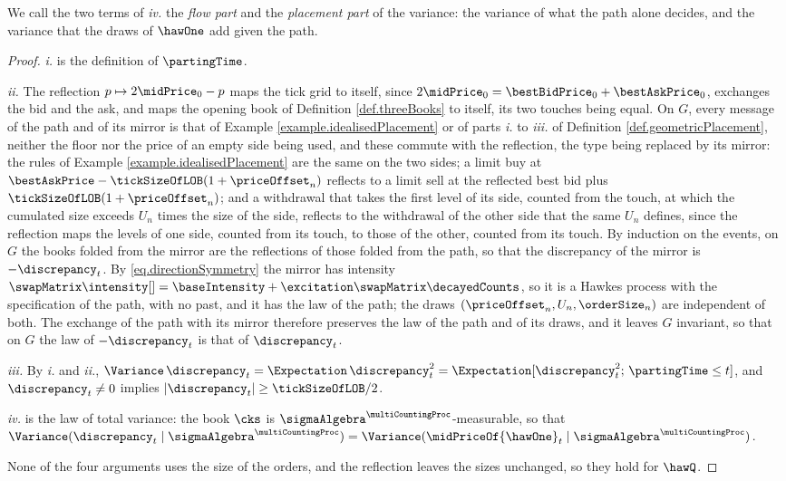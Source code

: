 We call the two terms of \emph{iv.} the \emph{flow part} and the \emph{placement part}
of the variance:
the variance of what the path alone decides,
and the variance that the draws of $\hawOne$ add given the path.

\begin{proof}
 \emph{i.} is the definition of $\partingTime$.

 \emph{ii.}
 The reflection $p \mapsto 2\midPrice_0 - p$ maps the tick grid to itself,
 since $2\midPrice_0 = \bestBidPrice_0 + \bestAskPrice_0$,
 exchanges the bid and the ask,
 and maps the opening book of Definition \ref{def.threeBooks} to itself,
 its two touches being equal.
 On $G$,
 every message of the path and of its mirror is that of
 Example \ref{example.idealisedPlacement}
 or of parts \emph{i.} to \emph{iii.} of Definition \ref{def.geometricPlacement},
 neither the floor nor the price of an empty side being used,
 and these commute with the reflection, the type being replaced by its mirror:
 the rules of Example \ref{example.idealisedPlacement} are the same on the two sides;
 a limit buy at $\bestAskPrice - \tickSizeOfLOB(1+\priceOffset_n)$
 reflects to a limit sell at the reflected best bid plus $\tickSizeOfLOB(1+\priceOffset_n)$;
 and a withdrawal that takes the first level of its side,
 counted from the touch,
 at which the cumulated size exceeds $U_n$ times the size of the side,
 reflects to the withdrawal of the other side that the same $U_n$ defines,
 since the reflection maps the levels of one side, counted from its touch,
 to those of the other, counted from its touch.
 By induction on the events,
 on $G$ the books folded from the mirror are the reflections of those folded from the path,
 so that the discrepancy of the mirror is $-\discrepancy_t$.
 By \eqref{eq.directionSymmetry} the mirror has intensity
 $\swapMatrix\intensity[ ] = \baseIntensity + \excitation\swapMatrix\decayedCounts$,
 so it is a Hawkes process with the specification of the path, with no past,
 and it has the law of the path;
 the draws $(\priceOffset_n, U_n, \orderSize_n)$ are independent of both.
 The exchange of the path with its mirror therefore preserves the law of the path and of
 its draws,
 and it leaves $G$ invariant,
 so that on $G$ the law of $-\discrepancy_t$ is that of $\discrepancy_t$.

 \emph{iii.}
 By \emph{i.} and \emph{ii.},
 $\Variance\,\discrepancy_t = \Expectation\,\discrepancy_t^{2}
 = \Expectation[\discrepancy_t^{2} ; \, \partingTime \leq t]$,
 and $\discrepancy_t \neq 0$ implies $\vert \discrepancy_t \vert \geq \tickSizeOfLOB/2$.

 \emph{iv.} is the law of total variance:
 the book $\cks$ is $\sigmaAlgebra^{\multiCountingProc}$-measurable,
 so that
 $\Variance(\discrepancy_t \mid \sigmaAlgebra^{\multiCountingProc})
 = \Variance(\midPriceOf{\hawOne}_t \mid \sigmaAlgebra^{\multiCountingProc})$.

 None of the four arguments uses the size of the orders,
 and the reflection leaves the sizes unchanged,
 so they hold for $\hawQ$.
\end{proof}

